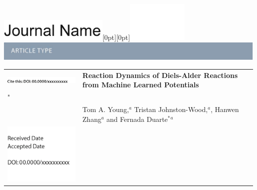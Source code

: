 \documentclass[twoside,twocolumn,9pt]{article}
\begin{document}
  \begin{@twocolumnfalse}
{\includegraphics[height=30pt]{head_foot/journal_name}\hfill\raisebox{0pt}[0pt][0pt]{\includegraphics[height=55pt]{head_foot/RSC_LOGO_CMYK}}\\[1ex]
\includegraphics[width=18.5cm]{head_foot/header_bar}}\par
\vspace{1em}
\sffamily
\begin{tabular}{m{4.5cm} p{13.5cm} }

\includegraphics{head_foot/DOI} & \noindent\LARGE{\textbf{Reaction Dynamics of Diels-Alder Reactions from Machine Learned Potentials}} \\%
"
 & \vspace{0.3cm} \\

 & \noindent\large{Tom A. Young,\textit{$^{a}$} Tristan Johnston-Wood,\textit{$^{a}$}, Hanwen Zhang\textit{$^{a}$} and Fernada Duarte$^\ast$\textit{$^{a}$}} \\%

\includegraphics{head_foot/dates} & \\

\end{tabular}

 \end{@twocolumnfalse} \vspace{0.6cm}
\end{document}
